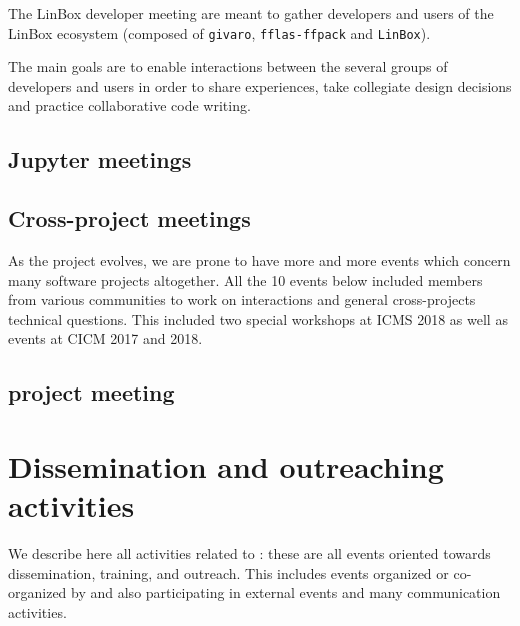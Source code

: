 \documentclass{deliverablereport}
\begin{document}
The LinBox developer meeting are meant to gather developers and users of the
LinBox ecosystem (composed of \texttt{givaro}, \texttt{fflas-ffpack} and
\texttt{LinBox}).

The main goals are to enable interactions between the several groups of
developers and users in order to share experiences, take collegiate design
decisions and practice collaborative code writing.





\subsection{Jupyter meetings}




\subsection{Cross-project meetings}

As the project evolves, we are prone to have more and more events which 
concern many software projects altogether. All the 10 events below
included members from various communities to work on interactions and
general cross-projects technical questions. This included two special
workshops at ICMS 2018 as well as events at CICM 2017 and 2018.









\subsection{\ODK project meeting}





\section{Dissemination and outreaching activities}

We describe here all activities related to :
these are all events oriented towards dissemination, training, and outreach. This
includes events organized or co-organized by \ODK and also
participating in external events and many communication activities.
\end{document}
